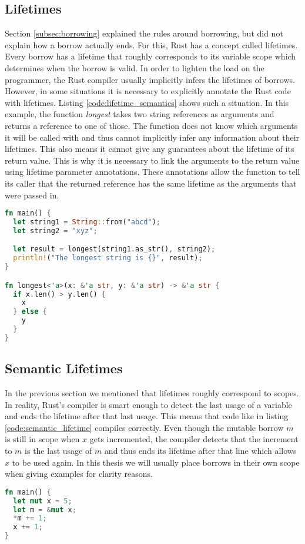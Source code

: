 \subsection{Lifetimes}
Section \ref{subsec:borrowing} explained the rules around borrowing, but did not explain how a borrow actually ends.
For this, Rust has a concept called lifetimes.
Every borrow has a lifetime that roughly corresponds to its variable scope which determines when the borrow is valid.
In order to lighten the load on the programmer, the Rust compiler usually implicitly infers the lifetimes of borrows.
However, in some situations it is necessary to explicitly annotate the Rust code with lifetimes.
Listing \ref{code:lifetime_semantics} shows such a situation.
In this example, the function \textit{longest} takes two string references as arguments and returns a reference to one of those.
The function does not know which arguments it will be called with and thus cannot implicitly infer any information about their lifetimes.
This also means it cannot give any guarantees about the lifetime of its return value.
This is why it is necessary to link the arguments to the return value using lifetime parameter annotations.
These annotations allow the function to tell its caller that the returned reference has the same lifetime as the arguments that were passed in.
\begin{lstlisting}[language=Rust,frame=single,caption=Lifetime Example,label=code:lifetime_semantics]
fn main() {
  let string1 = String::from("abcd");
  let string2 = "xyz";

  let result = longest(string1.as_str(), string2);
  println!("The longest string is {}", result);
}

fn longest<'a>(x: &'a str, y: &'a str) -> &'a str {
  if x.len() > y.len() {
    x
  } else {
    y
  }
}
\end{lstlisting} %

\subsection{Semantic Lifetimes}
\label{sec:semantic_lifetimes}
In the previous section we mentioned that lifetimes roughly correspond to scopes.
In reality, Rust's compiler is smart enough to detect the last usage of a variable and ends the lifetime after that last usage.
This means that code like in listing \ref{code:semantic_lifetime} compiles correctly.
Even though the mutable borrow $m$ is still in scope when $x$ gets incremented, the compiler detects that the increment to $m$ is the last usage of $m$ and thus ends its lifetime after that line which allows $x$ to be used again.
In this thesis we will usually place borrows in their own scope when giving examples for clarity reasons.
\begin{lstlisting}[language=Rust,frame=single,caption=Lifetime Example,label=code:semantic_lifetime]
fn main() {
  let mut x = 5;
  let m = &mut x;
  *m += 1;
  x += 1;
}
\end{lstlisting}

